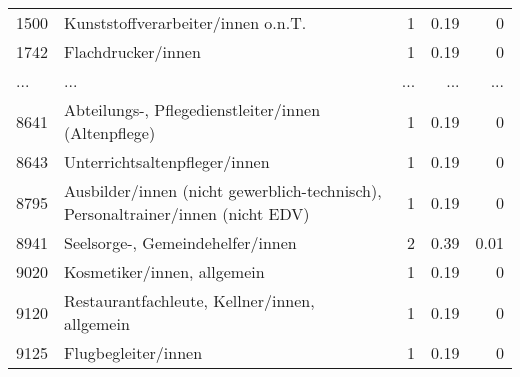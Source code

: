 \begin{longtable}{lXrrr}
        1500 & \multicolumn{1}{X}{Kunststoffverarbeiter/innen o.n.T.} & %
          \num{1} &
          \num[round-mode=places,round-precision=2]{0.19} &
          \num[round-mode=places,round-precision=2]{0} \\
        1742 & \multicolumn{1}{X}{Flachdrucker/innen} & %
          \num{1} &
          \num[round-mode=places,round-precision=2]{0.19} &
          \num[round-mode=places,round-precision=2]{0} \\
       ... & ... & ... & ... & ... \\
        8641 & \multicolumn{1}{X}{Abteilungs-, Pflegedienstleiter/innen (Altenpflege)} & %
          \num{1} &
          \num[round-mode=places,round-precision=2]{0.19} &
          \num[round-mode=places,round-precision=2]{0} \\

        8643 & \multicolumn{1}{X}{Unterrichtsaltenpfleger/innen} & %
          \num{1} &
          \num[round-mode=places,round-precision=2]{0.19} &
          \num[round-mode=places,round-precision=2]{0} \\

        8795 & \multicolumn{1}{X}{Ausbilder/innen (nicht gewerblich-technisch), Personaltrainer/innen (nicht EDV)} & %
          \num{1} &
          \num[round-mode=places,round-precision=2]{0.19} &
          \num[round-mode=places,round-precision=2]{0} \\

        8941 & \multicolumn{1}{X}{Seelsorge-, Gemeindehelfer/innen} & %
          \num{2} &
          \num[round-mode=places,round-precision=2]{0.39} &
          \num[round-mode=places,round-precision=2]{0.01} \\

        9020 & \multicolumn{1}{X}{Kosmetiker/innen, allgemein} & %
          \num{1} &
          \num[round-mode=places,round-precision=2]{0.19} &
          \num[round-mode=places,round-precision=2]{0} \\

        9120 & \multicolumn{1}{X}{Restaurantfachleute, Kellner/innen, allgemein} & %
          \num{1} &
          \num[round-mode=places,round-precision=2]{0.19} &
          \num[round-mode=places,round-precision=2]{0} \\

        9125 & \multicolumn{1}{X}{Flugbegleiter/innen} & %
          \num{1} &
          \num[round-mode=places,round-precision=2]{0.19} &
          \num[round-mode=places,round-precision=2]{0} \\


\end{longtable}
